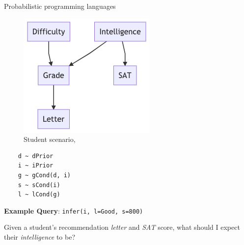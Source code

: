 \begin{frame}[fragile]{Probabilistic programming languages}
\begin{minipage}{0.4\linewidth}
    \begin{figure}
        \centering
        \includegraphics[width=\linewidth]{Figures/lic/student-network.png}
        \caption{Student scenario, \parencite{koller2009probabilistic}}
    \end{figure}
\end{minipage}
\begin{minipage}{0.58\linewidth}
    \begin{verbatim}
    d ~ dPrior
    i ~ iPrior
    g ~ gCond(d, i)
    s ~ sCond(i)
    l ~ lCond(g)
    \end{verbatim}
\end{minipage}

\textbf{Example Query}: \texttt{infer(i, {l=Good, s=800})}

Given a student's recommendation \emph{letter} and \emph{SAT} score,
what should I expect their \emph{intelligence} to be?


\end{frame}


